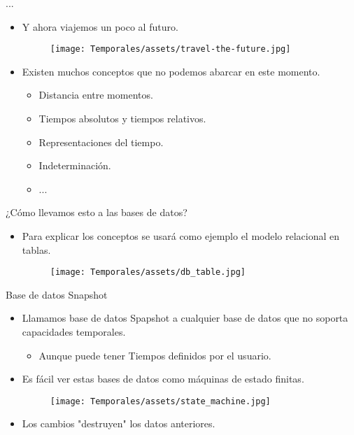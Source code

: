 \documentclass[handout, t, aspectratio=169]{beamer}
\begin{document}
\begin{frame}{...}
    \begin{itemize}
        \item Y ahora viajemos un poco al futuro.\pause
        \begin{figure}
            \centering
            \texttt{[image: Temporales/assets/travel-the-future.jpg]}
        \end{figure}\pause
        \item Existen muchos conceptos que no podemos abarcar en este momento.\pause
        \begin{itemize}
            \item Distancia entre momentos.\pause
            \item Tiempos absolutos y tiempos relativos.\pause
            \item Representaciones del tiempo.\pause
            \item Indeterminación.\pause
            \item ...
        \end{itemize}
    \end{itemize}
\end{frame}

\begin{frame}{¿Cómo llevamos esto a las bases de datos?}
    \begin{itemize}
        \item Para explicar los conceptos se usará como ejemplo el modelo relacional en tablas.\pause
        \begin{figure}
            \centering
             \texttt{[image: Temporales/assets/db\_table.jpg]}
        \end{figure}
    \end{itemize}
\end{frame}

\begin{frame}{Base de datos Snapshot}
    \begin{itemize}
        \item Llamamos base de datos Spapshot a cualquier base de datos que no soporta capacidades temporales.\pause
        \begin{itemize}
            \item Aunque puede tener Tiempos definidos por el usuario.
        \end{itemize}\pause
        \item Es fácil ver estas bases de datos como máquinas de estado finitas.\pause
        \begin{figure}
            \centering
            \texttt{[image: Temporales/assets/state\_machine.jpg]}
        \end{figure}\pause
        \item Los cambios "destruyen" los datos anteriores.
    \end{itemize}
\end{frame}
\end{document}
